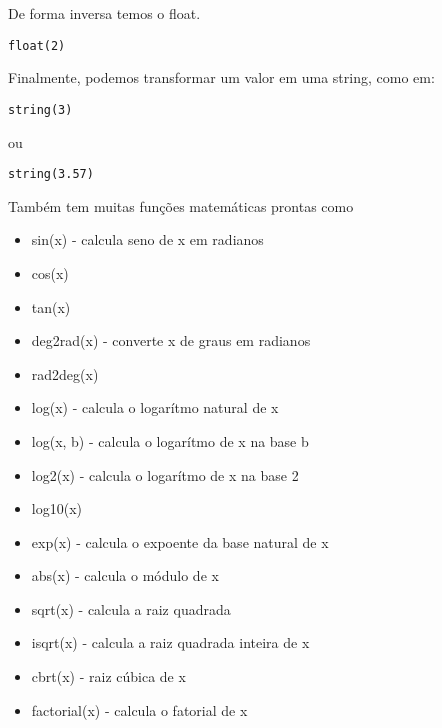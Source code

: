 \documentclass[a4paper]{article}
\begin{document}
De forma inversa temos o float.

\lstset{language=ein-julia,label=orgf8984f0,caption= ,captionpos=b,numbers=none}
\begin{lstlisting}
float(2)
\end{lstlisting}

Finalmente, podemos transformar um valor em uma string, como em:

\lstset{language=ein-julia,label=org8e112ed,caption= ,captionpos=b,numbers=none}
\begin{lstlisting}
string(3)
\end{lstlisting}
ou
\lstset{language=ein-julia,label=org5401c13,caption= ,captionpos=b,numbers=none}
\begin{lstlisting}
string(3.57)
\end{lstlisting}

Também tem muitas funções matemáticas prontas como
\begin{itemize}
\item sin(x) - calcula  seno de x em radianos
\item cos(x)
\item tan(x)
\item deg2rad(x) - converte x de graus em radianos
\item rad2deg(x)
\item log(x) - calcula o logarítmo natural de x
\item log(x, b) - calcula o logarítmo de x na base b
\item log2(x) - calcula o logarítmo de x na base 2
\item log10(x)
\item exp(x) - calcula o expoente da base natural de x
\item abs(x) - calcula o módulo de x
\item sqrt(x) - calcula a raiz quadrada
\item isqrt(x) - calcula a raiz quadrada inteira de x
\item cbrt(x) - raiz cúbica de x
\item factorial(x) - calcula o fatorial de x
\end{itemize}
\end{document}
